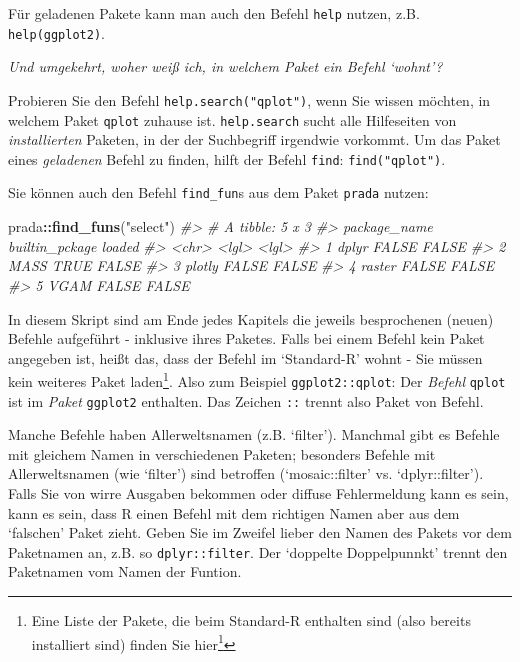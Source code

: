 \documentclass[12pt,ngerman,]{book}
\makeatletter
\newenvironment{Shaded}{\begin{snugshade}}{\end{snugshade}}
\newcommand{\KeywordTok}[1]{\textcolor[rgb]{0.13,0.29,0.53}{\textbf{#1}}}
\newcommand{\StringTok}[1]{\textcolor[rgb]{0.31,0.60,0.02}{#1}}
\newcommand{\CommentTok}[1]{\textcolor[rgb]{0.56,0.35,0.01}{\textit{#1}}}
\newcommand{\OperatorTok}[1]{\textcolor[rgb]{0.81,0.36,0.00}{\textbf{#1}}}
\newcommand{\NormalTok}[1]{#1}
\let\rmarkdownfootnote\footnote%
\def\footnote{\protect\rmarkdownfootnote}
\renewcommand{\href}[2]{#2\footnote{\url{#1}}}
\newenvironment{kframe}{%
\medskip{}
\setlength{\fboxsep}{.8em}
 \def\at@end@of@kframe{}%
 \ifinner\ifhmode%
  \def\at@end@of@kframe{\end{minipage}}%
  \begin{minipage}{\columnwidth}%
 \fi\fi%
 \def\FrameCommand##1{\hskip\@totalleftmargin \hskip-\fboxsep
 \colorbox{shadecolor}{##1}\hskip-\fboxsep
     \hskip-\linewidth \hskip-\@totalleftmargin \hskip\columnwidth}%
 \MakeFramed {\advance\hsize-\width
   \@totalleftmargin\z@ \linewidth\hsize
   \@setminipage}}%
 {\par\unskip\endMakeFramed%
 \at@end@of@kframe}
\renewenvironment{Shaded}{\begin{kframe}}{\end{kframe}}
\theoremstyle{definition}
\theoremstyle{definition}
\theoremstyle{remark}
\let\BeginKnitrBlock\begin \let\EndKnitrBlock\end
\makeatother
\begin{document}
Für geladenen Pakete kann man auch den Befehl \texttt{help} nutzen, z.B.
\texttt{help(ggplot2)}.

\emph{Und umgekehrt, woher weiß ich, in welchem Paket ein Befehl
`wohnt'?}

Probieren Sie den Befehl \texttt{help.search("qplot")}, wenn Sie wissen
möchten, in welchem Paket \texttt{qplot} zuhause ist.
\texttt{help.search} sucht alle Hilfeseiten von \emph{installierten}
Paketen, in der der Suchbegriff irgendwie vorkommt. Um das Paket eines
\emph{geladenen} Befehl zu finden, hilft der Befehl \texttt{find}:
\texttt{find("qplot")}.

Sie können auch den Befehl \texttt{find\_fun}s aus dem Paket
\texttt{prada} nutzen:

\begin{Shaded}
\begin{Highlighting}[]
\NormalTok{prada}\OperatorTok{::}\KeywordTok{find_funs}\NormalTok{(}\StringTok{"select"}\NormalTok{)}
\CommentTok{#> # A tibble: 5 x 3}
\CommentTok{#>   package_name builtin_pckage loaded}
\CommentTok{#>          <chr>          <lgl>  <lgl>}
\CommentTok{#> 1        dplyr          FALSE  FALSE}
\CommentTok{#> 2         MASS           TRUE  FALSE}
\CommentTok{#> 3       plotly          FALSE  FALSE}
\CommentTok{#> 4       raster          FALSE  FALSE}
\CommentTok{#> 5         VGAM          FALSE  FALSE}
\end{Highlighting}
\end{Shaded}

In diesem Skript sind am Ende jedes Kapitels die jeweils besprochenen
(neuen) Befehle aufgeführt - inklusive ihres Paketes. Falls bei einem
Befehl kein Paket angegeben ist, heißt das, dass der Befehl im
`Standard-R' wohnt - Sie müssen kein weiteres Paket laden\footnote{Eine
  Liste der Pakete, die beim Standard-R enthalten sind (also bereits
  installiert sind) finden Sie
  \href{https://stat.ethz.ch/R-manual/R-devel/doc/html/packages.html}{hier}}.
Also zum Beispiel \texttt{ggplot2::qplot}: Der \emph{Befehl}
\texttt{qplot} ist im \emph{Paket} \texttt{ggplot2} enthalten. Das
Zeichen \texttt{::} trennt also Paket von Befehl.

\BeginKnitrBlock{rmdcaution}
Manche Befehle haben Allerweltsnamen (z.B. `filter'). Manchmal gibt es
Befehle mit gleichem Namen in verschiedenen Paketen; besonders Befehle
mit Allerweltsnamen (wie `filter') sind betroffen (`mosaic::filter' vs.
`dplyr::filter'). Falls Sie von wirre Ausgaben bekommen oder diffuse
Fehlermeldung kann es sein, kann es sein, dass R einen Befehl mit dem
richtigen Namen aber aus dem `falschen' Paket zieht. Geben Sie im
Zweifel lieber den Namen des Pakets vor dem Paketnamen an, z.B. so
\texttt{dplyr::filter}. Der `doppelte Doppelpunnkt' trennt den
Paketnamen vom Namen der Funtion.
\EndKnitrBlock{rmdcaution}
\end{document}
